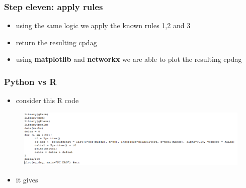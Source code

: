 \documentclass[xcolor ={table,usenames,dvipsnames}]{beamer}
\theoremstyle{definition}
\begin{document}
\begin{frame}
\frametitle{Step eleven: apply rules}
\begin{itemize}
	\item using the same logic we apply the known rules 1,2 and 3
	\item return the resulting cpdag
	\item using \textbf{matplotlib} and \textbf{networkx} we are able to plot the resulting cpdag
\end{itemize}
\end{frame}

\begin{frame}
\frametitle{Python vs R}
\begin{itemize}
	\item consider this R code
\end{itemize}
	\begin{figure}[h!]
		\centering
		\includegraphics[scale=0.5]{img/r.PNG}
	\end{figure}
\begin{itemize}
	\item it gives
	\end{itemize}
\end{frame}
\end{document}
